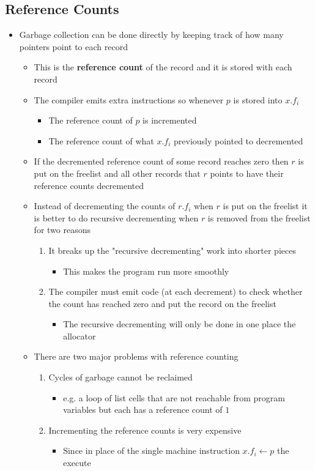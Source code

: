 \documentclass[11pt]{article}
\begin{document}
\subsection{Reference Counts}
\label{sec:org615e0e0}
\begin{itemize}
\item Garbage collection can be done directly by keeping track of how many pointers point to each record
\begin{itemize}
\item This is the \textbf{reference count} of the record and it is stored with each record
\item The compiler emits extra instructions so whenever \(p\) is stored into \(x.f_i\)
\begin{itemize}
\item The reference count of \(p\) is incremented
\item The reference count of what \(x.f_i\) previously pointed to decremented
\end{itemize}
\item If the decremented reference count of some record reaches zero then \(r\) is put on the freelist and all other records that \(r\) points to have their reference counts decremented
\item Instead of decrementing the counts of \(r.f_i\) when \(r\) is put on the freelist it is better to do recursive decrementing when \(r\) is removed from the freelist for two reasons
\begin{enumerate}
\item It breaks up the "recursive decrementing" work into shorter pieces
\begin{itemize}
\item This makes the program run more smoothly
\end{itemize}
\item The compiler must emit code (at each decrement) to check whether the count has reached zero and put the record on the freelist
\begin{itemize}
\item The recursive decrementing will only be done in one place the allocator
\end{itemize}
\end{enumerate}
\item There are two major problems with reference counting
\begin{enumerate}
\item Cycles of garbage cannot be reclaimed
\begin{itemize}
\item e.g. a loop of list cells that are not reachable from program variables but each has a reference count of \(1\)
\end{itemize}
\item Incrementing the reference counts is very expensive
\begin{itemize}
\item Since in place of the single machine instruction \(x.f_i \leftarrow p\) the execute
\end{itemize}
\end{enumerate}
\end{itemize}
\end{itemize}
\end{document}
